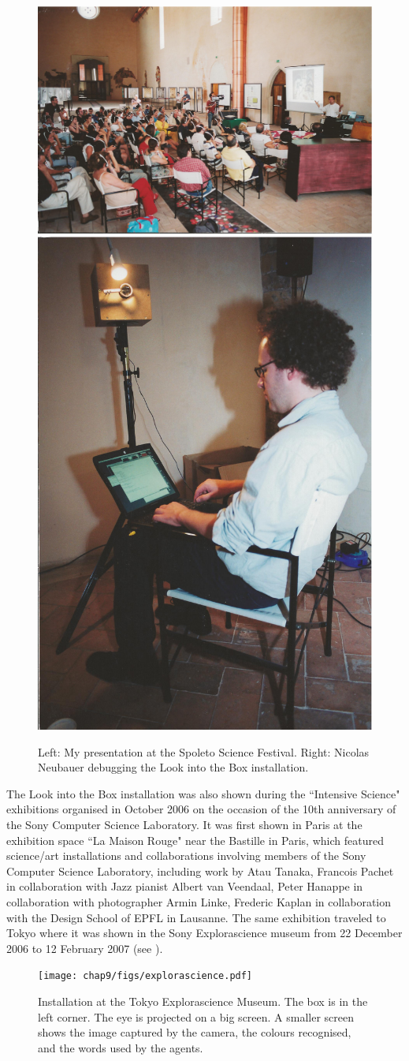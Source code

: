 \begin{figure}[htbp]
  \centerline{\includegraphics[width=.65\textwidth]{chap9/figs/ital-talk.pdf}
\includegraphics[width=.30\textwidth]{chap9/figs/ital2.pdf}}
\caption{\label{fig:spoleto}Left: My presentation at the Spoleto Science Festival. Right: Nicolas Neubauer debugging 
the Look into the Box installation.
 }
\end{figure}

\clearpage The Look into the Box installation was also shown during the ``Intensive Science" exhibitions organised in October 
2006 on the occasion of the 10th anniversary of the Sony Computer Science Laboratory.
It was first shown in Paris at 
the exhibition space ``La Maison Rouge" near the Bastille in Paris, which featured science/art installations 
and collaborations involving members of the Sony Computer Science Laboratory, including work by Atau Tanaka, 
Francois Pachet in collaboration with Jazz pianist Albert van Veendaal, Peter Hanappe in collaboration with 
photographer Armin Linke, Frederic Kaplan in collaboration with the Design School of EPFL in Lausanne. 
The same exhibition traveled to Tokyo where it was shown in the Sony Explorascience museum from 22 December 2006 
to 12 February 2007 (see ). 
\begin{figure}[htbp]
  \centerline{\texttt{[image: chap9/figs/explorascience.pdf]}}
\caption{\label{fig:intensive-science}Installation at the Tokyo Explorascience Museum. The box is in the left corner. The eye is projected on a 
big screen. A smaller screen shows the image captured by the camera, the colours recognised, and the words used by 
the agents.}
\end{figure}
